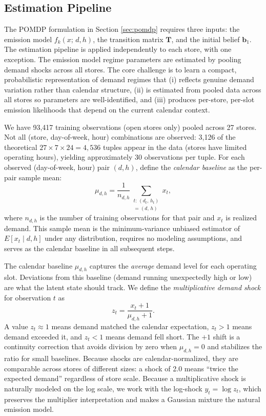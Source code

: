\documentclass[preprint,11pt,authoryear]{elsarticle}
\newcommand{\bvec}[1]{\mathbf{#1}}
\theoremstyle{remark}
\begin{document}
\subsection{Estimation Pipeline}
\label{sec:estimation_overview}

The POMDP formulation in Section \ref{sec:pomdp} requires three inputs: the emission model $f_k(x;\, d, h)$, the transition matrix $\bvec{T}$, and the initial belief $\bvec{b}_1$. The estimation pipeline is applied independently to each store, with one exception. The emission model regime parameters are estimated by pooling demand shocks across all stores. The core challenge is to learn a compact, probabilistic representation of demand regimes that (i) reflects genuine demand variation rather than calendar structure, (ii) is estimated from pooled data across all stores so parameters are well-identified, and (iii) produces per-store, per-slot emission likelihoods that depend on the current calendar context.

We have 93,417 training observations (open stores only) pooled across 27 stores. Not all (store, day-of-week, hour) combinations are observed: 3,126 of the theoretical $27 \times 7 \times 24 = 4{,}536$ tuples appear in the data (stores have limited operating hours), yielding approximately 30 observations per tuple. For each observed (day-of-week, hour) pair $(d, h)$, define the \emph{calendar baseline} as the per-pair sample mean:
\begin{equation}
    \mu_{d,h} = \frac{1}{n_{d,h}} \sum_{\substack{t:\,(d_t,\,h_t)\\=(d,\,h)}} x_t,
    \label{eq:lambda}
\end{equation}
where $n_{d,h}$ is the number of training observations for that pair and $x_t$ is realized demand. This sample mean is the minimum-variance unbiased estimator of $E[x_t \mid d, h]$ under any distribution, requires no modeling assumptions, and serves as the calendar baseline in all subsequent steps.

The calendar baseline $\mu_{d,h}$ captures the \emph{average} demand level for each operating slot. Deviations from this baseline (demand running unexpectedly high or low) are what the latent state should track. We define the \emph{multiplicative demand shock} for observation $t$ as
\begin{equation}
    z_t = \frac{x_t + 1}{\mu_{d,h} + 1}.
    \label{eq:shock}
\end{equation}
A value $z_t \approx 1$ means demand matched the calendar expectation, $z_t > 1$ means demand exceeded it, and $z_t < 1$ means demand fell short. The $+1$ shift is a continuity correction that avoids division by zero when $\mu_{d,h} = 0$ and stabilizes the ratio for small baselines. Because shocks are calendar-normalized, they are comparable across stores of different sizes: a shock of 2.0 means ``twice the expected demand'' regardless of store scale. Because a multiplicative shock is naturally modeled on the log scale, we work with the log-shock $y_t = \log z_t$, which preserves the multiplier interpretation and makes a Gaussian mixture the natural emission model.
\end{document}
